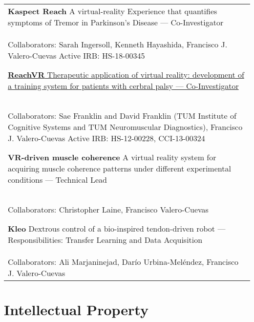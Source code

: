 \documentclass[10pt,a4paper]{article}
\begin{document}
  \vspace*{1mm}
  \begin{tabularx}{17cm}{X}
  \textbf{Kaspect Reach} A virtual-reality Experience that quantifies symptoms of Tremor in Parkinson's Disease --- Co-Investigator\\
  Collaborators: Sarah Ingersoll, Kenneth Hayashida, Francisco J. Valero-Cuevas
  Active IRB: HS-18-00345


  \vspace*{3mm}
  \href{http://www.bacatec.de/en/gefoerderte_projekte.html}{\textbf{ReachVR} Therapeutic application of virtual reality: development of a training system for patients with cerbral palsy --- Co-Investigator}\\
  Collaborators: Sae Franklin and David Franklin (TUM Institute of Cognitive Systems and TUM Neuromuscular Diagnostics), Francisco J. Valero-Cuevas
  Active IRB: HS-12-00228, CCI-13-00324


  \vspace*{3mm}
  \textbf{VR-driven muscle coherence} A virtual reality system for acquiring muscle coherence patterns under different experimental conditions --- Technical Lead\\
  Collaborators: Christopher Laine, Francisco Valero-Cuevas




  \vspace*{3mm}
  \textbf{Kleo} Dextrous control of a bio-inspired tendon-driven robot --- Responsibilities: Transfer Learning and Data Acquisition\\
  Collaborators: Ali Marjaninejad, Dar\'{i}o Urbina-Mel\'{e}ndez, Francisco J. Valero-Cuevas


  \end{tabularx}


\vspace*{3mm}\section*{Intellectual Property}
\end{document}

